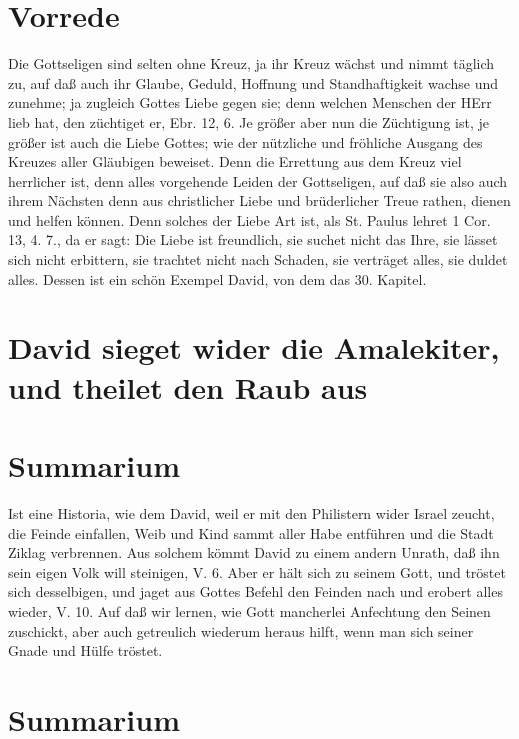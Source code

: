 \section{Vorrede}

Die Gottseligen sind selten ohne Kreuz, ja ihr Kreuz wächst und nimmt täglich zu, auf daß auch ihr Glaube, Geduld, Hoffnung und Standhaftigkeit wachse und zunehme; ja zugleich Gottes Liebe gegen sie; denn welchen Menschen der HErr lieb hat, den züchtiget er, Ebr. 12, 6. Je größer aber nun die Züchtigung ist, je größer ist auch die Liebe Gottes; wie der nützliche und fröhliche Ausgang des Kreuzes aller Gläubigen beweiset. Denn die Errettung aus dem Kreuz viel herrlicher ist, denn alles vorgehende Leiden der Gottseligen, auf daß sie also auch ihrem Nächsten denn aus christlicher Liebe und brüderlicher Treue rathen, dienen und helfen können. Denn solches der Liebe Art ist, als St. Paulus lehret 1 Cor. 13, 4. 7., da er sagt: Die Liebe ist freundlich, sie suchet nicht das Ihre, sie lässet sich nicht erbittern, sie trachtet nicht nach Schaden, sie verträget alles, sie duldet alles. Dessen ist ein schön Exempel David, von dem das 30. Kapitel.

\section[David sieget wider die Amalekiter, und theilet den]{David sieget wider die Amalekiter, und theilet den Raub aus}

\section{Summarium}

Ist eine Historia, wie dem David, weil er mit den Philistern wider Israel zeucht, die Feinde einfallen, Weib und Kind sammt aller Habe entführen und die Stadt Ziklag verbrennen. Aus solchem kömmt David zu einem andern Unrath, daß ihn sein eigen Volk will steinigen, V. 6. Aber er hält sich zu seinem Gott, und tröstet sich desselbigen, und jaget aus Gottes Befehl den Feinden nach und erobert alles wieder, V. 10. Auf daß wir lernen, wie Gott mancherlei Anfechtung den Seinen zuschickt, aber auch getreulich wiederum heraus hilft, wenn man sich seiner Gnade und Hülfe tröstet.

\section{Summarium}

